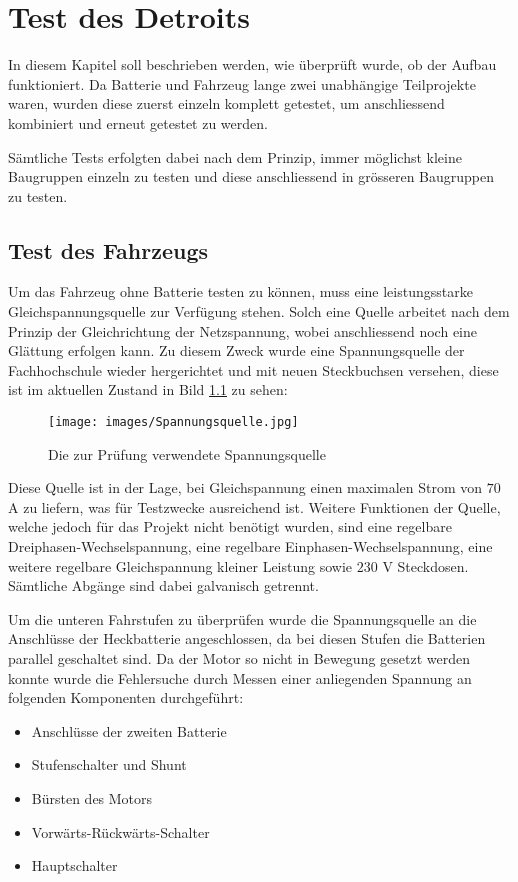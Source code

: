\chapter{Test des Detroits}
In diesem Kapitel soll beschrieben werden, wie überprüft wurde, ob der Aufbau funktioniert. Da Batterie und Fahrzeug lange zwei unabhängige Teilprojekte waren, wurden diese zuerst einzeln komplett getestet, um anschliessend kombiniert und erneut getestet zu werden.

Sämtliche Tests erfolgten dabei nach dem Prinzip, immer möglichst kleine Baugruppen einzeln zu testen und diese anschliessend in grösseren Baugruppen zu testen.

\section{Test des Fahrzeugs}
Um das Fahrzeug ohne Batterie testen zu können, muss eine leistungsstarke Gleichspannungsquelle zur Verfügung stehen. Solch eine Quelle arbeitet nach dem Prinzip der Gleichrichtung der Netzspannung, wobei anschliessend noch eine Glättung erfolgen kann. Zu diesem Zweck wurde eine Spannungsquelle der Fachhochschule wieder hergerichtet und mit neuen Steckbuchsen versehen, diese ist im aktuellen Zustand in Bild \ref{fig:Spannungsquelle_blau} zu sehen:

\begin{figure}[h]
	\centering
		\texttt{[image: images/Spannungsquelle.jpg]}
	\caption{Die zur Prüfung verwendete Spannungsquelle}
	\label{fig:Spannungsquelle_blau}
\end{figure}

Diese Quelle ist in der Lage, bei Gleichspannung einen maximalen Strom von $70$ A zu liefern, was für Testzwecke ausreichend ist. Weitere Funktionen der Quelle, welche jedoch für das Projekt nicht benötigt wurden, sind eine regelbare Dreiphasen-Wechselspannung, eine regelbare Einphasen-Wechselspannung, eine weitere regelbare Gleichspannung kleiner Leistung sowie $230$ V Steckdosen. Sämtliche Abgänge sind dabei galvanisch getrennt.

Um die unteren Fahrstufen zu überprüfen wurde die Spannungsquelle an die Anschlüsse der Heckbatterie angeschlossen, da bei diesen Stufen die Batterien parallel geschaltet sind. Da der Motor so nicht in Bewegung gesetzt werden konnte wurde die Fehlersuche durch Messen einer anliegenden Spannung an folgenden Komponenten durchgeführt: \begin{itemize}
	\item Anschlüsse der zweiten Batterie
	\item Stufenschalter und Shunt
	\item Bürsten des Motors
	\item Vorwärts-Rückwärts-Schalter
	\item Hauptschalter
\end{itemize}

